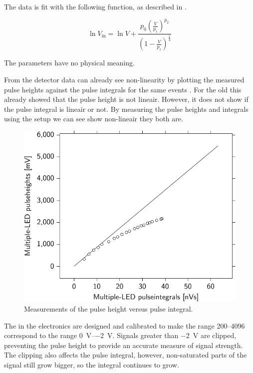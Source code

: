 The data is fit with the following function, as described in
\cite{icecube:pmt}.

\begin{equation}
    \ln V_{\mathrm{in}} = \ln V +
                          \frac{p_0 \left(\frac{V}{p_1}\right)^{p_2}}
                               {\left(1 - \frac{V}{p_1}\right)^{\frac{1}{4}}}
\end{equation}

The parameters have no physical meaning.


From the detector data can already see non-linearity by plotting the
measured pulse heights against the pulse integrals for the same events
. For the old \pmts this
already showed that the pulse height is not lineair. However, it does
not show if the pulse integral is lineair or not. By measuring the pulse
heights and integrals using the setup we can see show non-lineair they
both are.

\begin{figure}
    \centering
    \includegraphics{plots/calibration/linearity_senstech_ph_pi}
    \caption{Measurements of the pulse height versus pulse integral.}
    \label{fig:linearity_senstech_ph_pi}
\end{figure}

The \adcs in the \hisparc electronics are designed and calibrated to
make the range \SIrange{200}{4096}{\adc} correspond to the range
\SIrange{0}{-2}{\volt}. Signals greater than \SI{-2}{\volt} are clipped,
preventing the pulse height to provide an accurate measure of signal
strength. The clipping also affects the pulse integral, however,
non-saturated parts of the signal still grow bigger, so the integral
continues to grow.

